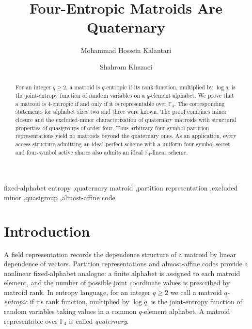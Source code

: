 \documentclass[preprint,12pt]{elsarticle}
\theoremstyle{definition}
\newcommand{\F}{\mathbb F}
\begin{document}
\begin{frontmatter}

\title{Four-Entropic Matroids Are Quaternary}

\author[sharif]{Mohammad Hossein Kalantari}
\author[sharif]{Shahram Khazaei}
\address[sharif]{Department of Mathematical Sciences, Sharif University of Technology, Tehran, Iran}

\begin{abstract}
For an integer $q\ge2$, a matroid is $q$-entropic if its rank function, multiplied by $\log q$, is the joint-entropy function of random variables on a $q$-element alphabet. We prove that a matroid is $4$-entropic if and only if it is representable over $\F_4$. The corresponding statements for alphabet sizes two and three were known. The proof combines minor closure and the excluded-minor characterization of quaternary matroids with structural properties of quasigroups of order four. Thus arbitrary four-symbol partition representations yield no matroids beyond the quaternary ones. As an application, every access structure admitting an ideal perfect scheme with a uniform four-symbol secret and four-symbol active shares also admits an ideal $\F_4$-linear scheme.
\end{abstract}

\begin{keyword}
fixed-alphabet entropy \sep quaternary matroid \sep partition representation \sep excluded minor \sep quasigroup \sep almost-affine code
\end{keyword}

\end{frontmatter}

\section{Introduction}\label{sec:intro}

A field representation records the dependence structure of a matroid by linear dependence of vectors. Partition representations and almost-affine codes provide a nonlinear fixed-alphabet analogue: a finite alphabet is assigned to each matroid element, and the number of possible joint coordinate values is prescribed by matroid rank. In entropy language, for an integer $q\ge2$ we call a matroid \emph{$q$-entropic} if its rank function, multiplied by $\log q$, is the joint-entropy function of random variables taking values in a common $q$-element alphabet. A matroid representable over $\F_4$ is called \emph{quaternary}.
\end{document}
